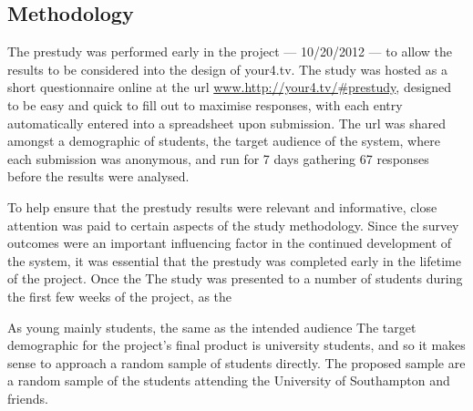 
\subsection{Methodology}

The prestudy was performed early in the project --- 10/20/2012 --- to allow the results to be considered into the design of your4.tv. The study was hosted as a short questionnaire online at the url \url{www.http://your4.tv/#prestudy}, designed to be easy and quick to fill out to maximise responses, with each entry automatically entered into a spreadsheet upon submission. The url was shared amongst a demographic of students, the target audience of the system, where each submission was anonymous, and run for 7 days gathering 67 responses before the results were analysed.

To help ensure that the prestudy results were relevant and informative, close attention was paid to certain aspects of the study methodology.
Since the survey outcomes were an important influencing factor in the continued development of the system, it was essential that the prestudy was completed early in the lifetime of the project. Once the 
The study was presented to a number of students during the first few weeks of the project, as the 

As young 
mainly students, the same as the intended audience
The target demographic for the project's final product is university students, and so it makes sense to approach a random sample of students directly.
The proposed sample are a random sample of the students attending the University of Southampton and friends.



